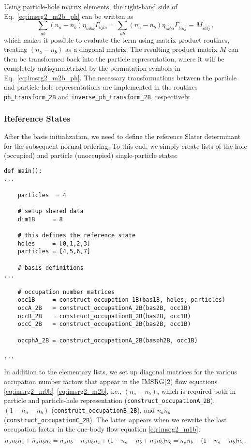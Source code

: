 {Using particle-hole matrix elements, the right-hand side of Eq.~\eqref{eq:imsrg2_m2b_ph} 
can be written as
\begin{equation}
  \sum_{ab}(n_a-n_b)\eta_{iabk}\Gamma_{bjla}
  = \sum_{ab}(n_a-n_b) \eta_{i\overline{k}b\overline{a}}\Gamma_{b\overline{a}l\overline{j}}
  \equiv M_{i\overline{k}l\overline{j}}\,,
\end{equation}
which makes it possible to evaluate the term using matrix product routines,
treating $(n_a-n_b)$ as a diagonal matrix. The resulting product matrix $M$
can then be transformed back into the particle representation, where it will 
be completely antisymmetrized by the permutation symbols in Eq.~\eqref{eq:imsrg2_m2b_ph}. 
The necessary transformations between the particle and particle-hole 
representations are implemented in the routines \texttt{ph\_transform\_2B}
and \texttt{inverse\_ph\_transform\_2B}, respectively.

\subsubsection*{Reference States}
After the basis initialization, we need to define the reference Slater
determinant \ket{\Phi} for the subsequent normal ordering. To this end, 
we simply create lists of the hole (occupied) and particle (unoccupied)
single-particle states:
\begin{lstlisting}
def main():
...

    particles  = 4

    # setup shared data
    dim1B     = 8

    # this defines the reference state
    holes     = [0,1,2,3]
    particles = [4,5,6,7]

    # basis definitions
...

    # occupation number matrices
    occ1B     = construct_occupation_1B(bas1B, holes, particles)
    occA_2B   = construct_occupationA_2B(bas2B, occ1B)
    occB_2B   = construct_occupationB_2B(bas2B, occ1B)
    occC_2B   = construct_occupationC_2B(bas2B, occ1B)

    occphA_2B = construct_occupationA_2B(basph2B, occ1B)

...
\end{lstlisting}
In addition to the elementary lists, we set up diagonal matrices for
the various occupation number factors that appear in the IMSRG(2)
flow equations \eqref{eq:imsrg2_m0b}--\eqref{eq:imsrg2_m2b},
i.e., $(n_a - n_b)$, which is required both in particle and particle-hole
representation (\texttt{construct\_occupationA\_2B}), $(1-n_a-n_b)$
(\texttt{construct\_occupationB\_2B}), and $n_a n_b$ (\texttt{construct\_occupationC\_2B}).
The latter appears when we rewrite the last occupation factor in 
the one-body flow equation \eqref{eq:imsrg2_m1b}:
\begin{equation}
  n_a n_b \bar{n}_c + \bar{n}_a \bar{n}_b n_c = n_a n_b - n_a n_b n_c + (1 - n_a - n_b + n_a n_b) n_c
  = n_a n_b + (1-n_a - n_b)n_c\,.
\end{equation}

}
